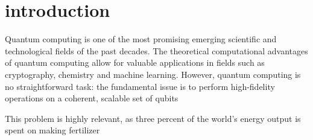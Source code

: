 \chapter{introduction}

Quantum computing is one of the most promising emerging scientific and technological fields of the past decades. The theoretical computational advantages of quantum computing allow for valuable applications in fields such as cryptography, chemistry and machine learning. However, quantum computing is no straightforward task: the fundamental issue is to perform high-fidelity operations on a coherent, scalable set of qubits %


This problem is highly relevant, as three percent of the world's energy output is spent on making fertilizer %
